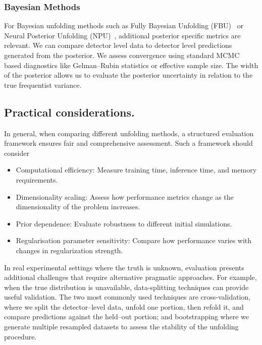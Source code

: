         \subsubsection{Bayesian Methods}
            For Bayesian unfolding methods such as Fully Bayesian Unfolding (FBU)~\cite{choudalakis_fully_2012} or Neural Posterior Unfolding (NPU)~\cite{acosta2024npu}, additional posterior specific metrics are relevant.
            We can compare detector level data to detector level predictions generated from the posterior.
            We assess convergence using standard MCMC based diagnostics like Gelman--Rubin statistics or effective sample size.
            The width of the posterior allows us to evaluate the posterior uncertainty in relation to the true frequentist variance.

    \subsection{Practical considerations.}
        In general, when comparing different unfolding methods, a structured evaluation framework ensures fair and comprehensive assessment. Such a framework should consider
        \begin{itemize}
            \item Computational efficiency: Measure training time, inference time, and memory requirements.
            \item Dimensionality scaling: Assess how performance metrics change as the dimensionality of the problem increases.
            \item Prior dependence: Evaluate robustness to different initial simulations.
            \item Regularisation parameter sensitivity: Compare how performance varies with changes in regularization strength.
        \end{itemize}

        In real experimental settings where the truth is unknown, evaluation presents additional challenges that require alternative pragmatic approaches.
        For example, when the true distribution is unavailable, data-splitting techniques can provide useful validation.
        The two most commonly used techniques are cross-validation, where we split the detector--level data, unfold one portion, then refold it, and compare predictions against the held--out portion; and bootstrapping where we generate multiple resampled datasets to assess the stability of the unfolding procedure.

